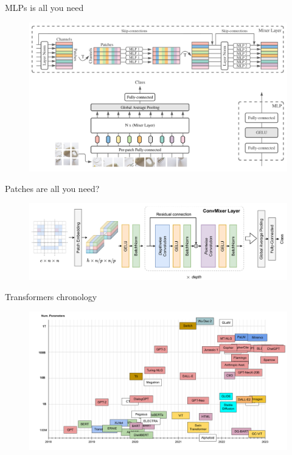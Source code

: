 \documentclass[xcolor=pdftex,dvipsnames,table,mathserif]{beamer}
\begin{document}
\begin{frame}{MLPs is all you need~\cite{tolstikhin_mlp-mixer_2021}}

  \begin{figure}[ht]
    \centering
    \includegraphics[width=\textwidth]{mixer}
  \end{figure}

\end{frame}


\begin{frame}{Patches are all you need?~\cite{trockman_patches_2022}}

\begin{figure}[ht]
  \centering
  \includegraphics[width=\textwidth]{conv_mixer}
\end{figure}


\end{frame}

\begin{frame}{Transformers chronology~\cite{amatriain_transformer_2023}}

\begin{figure}[ht]
  \centering
  \includegraphics[width=\textwidth]{02-09}
\end{figure}


\end{frame}
\end{document}
